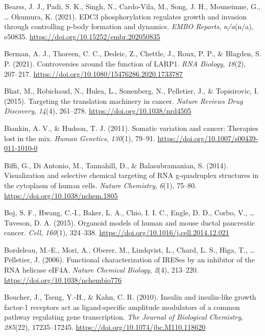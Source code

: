 \documentclass[12pt,openany]{book}
\begin{document}
\hypertarget{ref-Bearss2021}{}
Bearss, J. J., Padi, S. K., Singh, N., Cardo-Vila, M., Song, J. H.,
Mouneimne, G., \ldots{} Okumura, K. (2021). EDC3 phosphorylation
regulates growth and invasion through controlling p-body formation and
dynamics. \emph{EMBO Reports}, \emph{n/a}(n/a), e50835.
\url{https://doi.org/10.15252/embr.202050835}

\hypertarget{ref-Berman2021}{}
Berman, A. J., Thoreen, C. C., Dedeic, Z., Chettle, J., Roux, P. P., \&
Blagden, S. P. (2021). Controversies around the function of LARP1.
\emph{RNA Biology}, \emph{18}(2), 207--217.
\url{https://doi.org/10.1080/15476286.2020.1733787}

\hypertarget{ref-Bhat2015}{}
Bhat, M., Robichaud, N., Hulea, L., Sonenberg, N., Pelletier, J., \&
Topisirovic, I. (2015). Targeting the translation machinery in cancer.
\emph{Nature Reviews Drug Discovery}, \emph{14}(4), 261--278.
\url{https://doi.org/10.1038/nrd4505}

\hypertarget{ref-Biankin2011}{}
Biankin, A. V., \& Hudson, T. J. (2011). Somatic variation and cancer:
Therapies lost in the mix. \emph{Human Genetics}, \emph{130}(1), 79--91.
\url{https://doi.org/10.1007/s00439-011-1010-0}

\hypertarget{ref-Biffi2014}{}
Biffi, G., Di Antonio, M., Tannahill, D., \& Balasubramanian, S. (2014).
Visualization and selective chemical targeting of RNA g-quadruplex
structures in the cytoplasm of human cells. \emph{Nature Chemistry},
\emph{6}(1), 75--80. \url{https://doi.org/10.1038/nchem.1805}

\hypertarget{ref-Boj2015}{}
Boj, S. F., Hwang, C.-I., Baker, L. A., Chio, I. I. C., Engle, D. D.,
Corbo, V., \ldots{} Tuveson, D. A. (2015). Organoid models of human and
mouse ductal pancreatic cancer. \emph{Cell}, \emph{160}(1), 324--338.
\url{https://doi.org/10.1016/j.cell.2014.12.021}

\hypertarget{ref-Bordeleau2006}{}
Bordeleau, M.-E., Mori, A., Oberer, M., Lindqvist, L., Chard, L. S.,
Higa, T., \ldots{} Pelletier, J. (2006). Functional characterization of
IRESes by an inhibitor of the RNA helicase eIF4A. \emph{Nature Chemical
Biology}, \emph{2}(4), 213--220.
\url{https://doi.org/10.1038/nchembio776}

\hypertarget{ref-Boucher2010}{}
Boucher, J., Tseng, Y.-H., \& Kahn, C. R. (2010). Insulin and
insulin-like growth factor-1 receptors act as ligand-specific amplitude
modulators of a common pathway regulating gene transcription. \emph{The
Journal of Biological Chemistry}, \emph{285}(22), 17235--17245.
\url{https://doi.org/10.1074/jbc.M110.118620}
\end{document}
